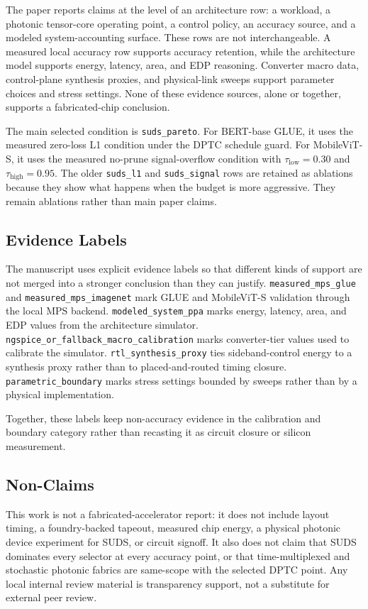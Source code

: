 \documentclass[10pt,journal]{IEEEtran}
\begin{document}
The paper reports claims at the level of an architecture row: a workload, a
photonic tensor-core operating point, a control policy, an accuracy source, and
a modeled system-accounting surface. These rows are not interchangeable. A
measured local accuracy row supports accuracy retention, while the architecture
model supports energy, latency, area, and EDP reasoning. Converter macro data,
control-plane synthesis proxies, and physical-link sweeps support parameter
choices and stress settings. None of these evidence sources, alone or together,
supports a fabricated-chip conclusion.

The main selected condition is \texttt{suds\_pareto}. For BERT-base GLUE, it
uses the measured zero-loss L1 condition under the DPTC schedule guard. For
MobileViT-S, it uses the measured no-prune signal-overflow condition with
\(\tau_{\mathrm{low}}=0.30\) and \(\tau_{\mathrm{high}}=0.95\). The older
\texttt{suds\_l1} and \texttt{suds\_signal} rows are retained as ablations
because they show what happens when the budget is more aggressive. They remain
ablations rather than main paper claims.

\subsection{Evidence Labels}

The manuscript uses explicit evidence labels so that different kinds of support
are not merged into a stronger conclusion than they can justify.
\texttt{measured\_mps\_glue} and \texttt{measured\_mps\_imagenet} mark GLUE
and MobileViT-S validation through the local MPS backend.
\texttt{modeled\_system\_ppa} marks energy, latency, area, and EDP values from
the architecture simulator.
\texttt{ngspice\_or\_fallback\_macro\_calibration} marks converter-tier values
used to calibrate the simulator.
\texttt{rtl\_synthesis\_proxy} ties sideband-control energy to a synthesis
proxy rather than to placed-and-routed timing closure.
\texttt{parametric\_boundary} marks stress settings bounded by sweeps rather
than by a physical implementation.

Together, these labels keep non-accuracy evidence in the calibration and
boundary category rather than recasting it as circuit closure or silicon
measurement.

\subsection{Non-Claims}

This work is not a fabricated-accelerator report: it does not include layout
timing, a foundry-backed tapeout, measured chip energy, a physical photonic
device experiment for SUDS, or circuit signoff. It also does not claim that
SUDS dominates every selector at every accuracy point, or that time-multiplexed
and stochastic photonic fabrics are same-scope with the selected DPTC point.
Any local internal review material is transparency support, not a substitute
for external peer review.
\end{document}
